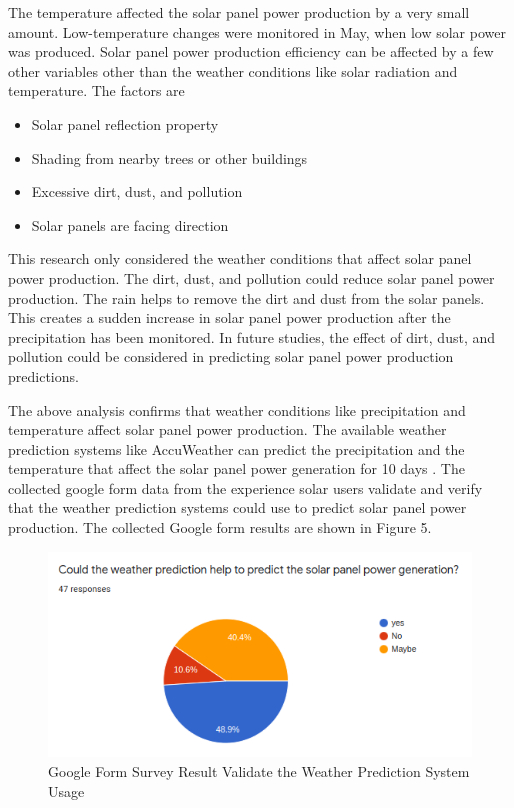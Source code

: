 \documentclass[conference]{IEEEtran}
\begin{document}
The temperature affected the solar panel power production by a very small amount. Low-temperature changes were monitored in May, when low solar power was produced. Solar panel power production efficiency can be affected by a few other variables other than the weather conditions like solar radiation and temperature. The factors are 
\begin{itemize}
  \item Solar panel reflection property
  \item Shading from nearby trees or other buildings
  \item Excessive dirt, dust, and pollution
  \item Solar panels are facing direction
\end{itemize}
This research only considered the weather conditions that affect solar panel power production. The dirt, dust, and pollution could reduce solar panel power production. The rain helps to remove the dirt and dust from the solar panels. This creates a sudden increase in solar panel power production after the precipitation has been monitored. In future studies, the effect of dirt, dust, and pollution could be considered in predicting solar panel power production predictions. 

The above analysis confirms that weather conditions like precipitation and temperature affect solar panel power production. The available weather prediction systems like AccuWeather can predict the precipitation and the temperature that affect the solar panel power generation for 10 days \cite{accuweather}. The collected google form data from the experience solar users validate and verify that the weather prediction systems could use to predict solar panel power production. The collected Google form results are shown in Figure 5. 

\begin{figure}[htp]
    \centering
    \includegraphics[width=\linewidth]{Images/WeatherPredictionValidation.png}
    \caption{Google Form Survey Result Validate the Weather Prediction System Usage}
    \label{fig:GoogleFormResult }
\end{figure}
\end{document}
